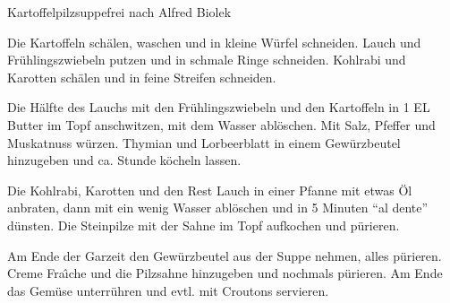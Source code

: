\begin{recipe}{Kartoffelpilzsuppe}{frei nach Alfred Biolek}
  \inglist

  \steps
  Die Kartoffeln schälen, waschen und in kleine Würfel schneiden. Lauch und
  Frühlingszwiebeln putzen und in schmale Ringe schneiden. Kohlrabi und
  Karotten schälen und in feine Streifen schneiden.

  Die Hälfte des Lauchs mit den Frühlingszwiebeln und den Kartoffeln in 1 EL
  Butter im Topf anschwitzen, mit dem Wasser ablöschen. Mit Salz, Pfeffer und
  Muskatnuss würzen. Thymian und Lorbeerblatt in einem Gewürzbeutel hinzugeben
  und ca. \halb Stunde köcheln lassen.

  Die Kohlrabi, Karotten und den Rest Lauch in einer Pfanne mit etwas
  Öl anbraten, dann mit ein wenig Wasser ablöschen und in 5 Minuten "`al
  dente"' dünsten. Die Steinpilze mit der Sahne im Topf aufkochen und pürieren.

  Am Ende der Garzeit den Gewürzbeutel aus der Suppe nehmen, alles pürieren.
  Creme Fra\^{\i}che und die Pilzsahne hinzugeben und nochmals pürieren. Am
  Ende das Gemüse unterrühren und evtl. mit Croutons servieren.
\end{recipe}
